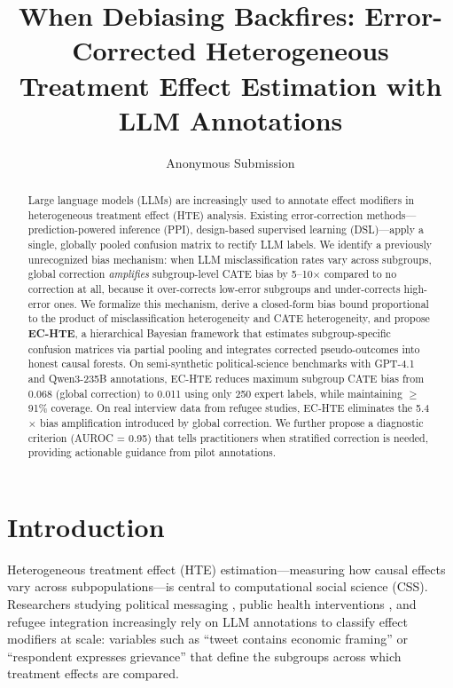 \documentclass[11pt,a4paper]{article}
\title{When Debiasing Backfires: Error-Corrected Heterogeneous Treatment Effect Estimation with LLM Annotations}
\author{Anonymous Submission}
\date{}
\begin{document}
\maketitle

\begin{abstract}
Large language models (LLMs) are increasingly used to annotate effect modifiers in heterogeneous treatment effect (HTE) analysis.
Existing error-correction methods---prediction-powered inference (PPI), design-based supervised learning (DSL)---apply a single, globally pooled confusion matrix to rectify LLM labels.
We identify a previously unrecognized bias mechanism: when LLM misclassification rates vary across subgroups, global correction \emph{amplifies} subgroup-level CATE bias by 5--10$\times$ compared to no correction at all, because it over-corrects low-error subgroups and under-corrects high-error ones.
We formalize this mechanism, derive a closed-form bias bound proportional to the product of misclassification heterogeneity and CATE heterogeneity, and propose \textbf{EC-HTE}, a hierarchical Bayesian framework that estimates subgroup-specific confusion matrices via partial pooling and integrates corrected pseudo-outcomes into honest causal forests.
On semi-synthetic political-science benchmarks with GPT-4.1 and Qwen3-235B annotations, EC-HTE reduces maximum subgroup CATE bias from 0.068 (global correction) to 0.011 using only 250 expert labels, while maintaining $\geq$91\% coverage.
On real interview data from refugee studies, EC-HTE eliminates the 5.4$\times$ bias amplification introduced by global correction.
We further propose a diagnostic criterion (AUROC = 0.95) that tells practitioners when stratified correction is needed, providing actionable guidance from pilot annotations.
\end{abstract}

\section{Introduction}
\label{sec:intro}

Heterogeneous treatment effect (HTE) estimation---measuring how causal effects vary across subpopulations---is central to computational social science (CSS).
Researchers studying political messaging \citep{egami2024dsl}, public health interventions \citep{athey2019estimating}, and refugee integration \citep{ashwin2025llm} increasingly rely on LLM annotations to classify effect modifiers at scale: variables such as ``tweet contains economic framing'' or ``respondent expresses grievance'' that define the subgroups across which treatment effects are compared.
\end{document}
